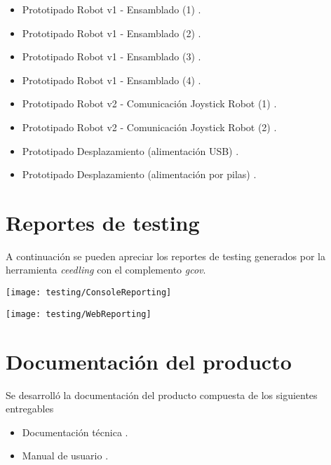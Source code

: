 \begin{itemize}
	\item Prototipado Robot v1 - Ensamblado (1) \cite{Prototipado_Ensamblado_1}.	
	\item Prototipado Robot v1 - Ensamblado (2) \cite{Prototipado_Ensamblado_2}.
	\item Prototipado Robot v1 - Ensamblado (3) \cite{Prototipado_Ensamblado_3}.
	\item Prototipado Robot v1 - Ensamblado (4) \cite{Prototipado_Ensamblado_4}.
	\item Prototipado Robot v2 - Comunicación Joystick Robot (1) \cite{Prototipado_Comunicacion_JoystickRobot1}.
	\item Prototipado Robot v2 - Comunicación Joystick Robot (2) \cite{Prototipado_Comunicacion_JoystickRobot2}.
	\item Prototipado Desplazamiento (alimentación USB) \cite{Prototipado_Desplazamiento_USB}.
	\item Prototipado Desplazamiento (alimentación por pilas) \cite{Prototipado_Desplazamiento_Pilas}.

\end{itemize}



\section{Reportes de testing}

A continuación se pueden apreciar los reportes de testing generados por la herramienta \textit{ceedling} con el complemento \textit{gcov}.


\begin{center}
   \texttt{[image: testing/ConsoleReporting]}
   \label{fig:ConsoleReporting}
\end{center}

\begin{center}
   \texttt{[image: testing/WebReporting]}
   \label{fig:WebReporting}
\end{center}




\section{Documentación del producto }

Se desarrolló la documentación del producto compuesta de los siguientes entregables
\begin{itemize}
	\item Documentación técnica \cite{Robot_Tecnical_doc}.
	\item Manual de usuario \cite{Robot_User_manual}.
\end{itemize}











